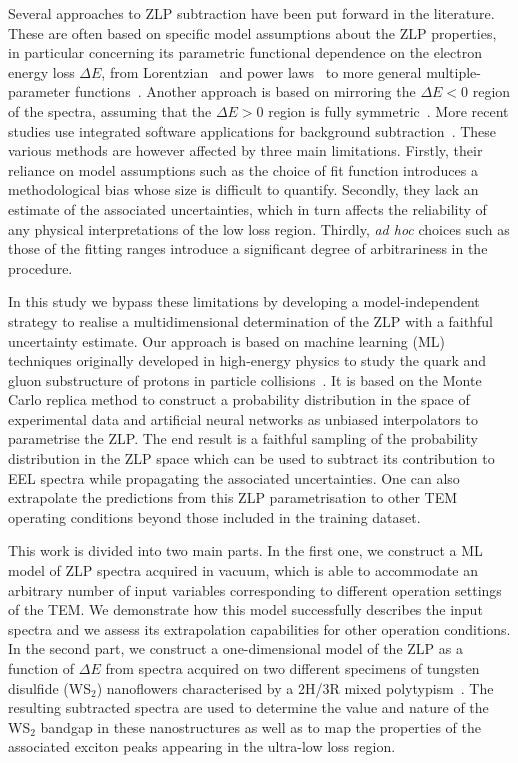 Several approaches to ZLP subtraction\cite{Rafferty:2000, Stoger:2008, Egerton:1996} 
have been put forward in the literature.
%
These are often based on specific model assumptions about the ZLP properties, in particular
concerning its parametric functional dependence on the electron energy loss $\Delta E$,
from Lorentzian~\cite{Dorneich:1998}
and power laws~\cite{Erni:2005} to more general multiple-parameter functions~\cite{Benthem:2001}.
%
Another approach is based on mirroring the $\Delta E <0$ region of the spectra, assuming
that the $\Delta E>0$ region is fully symmetric~\cite{Lazar:2003}.
%
More recent studies use integrated software applications for background
subtraction~\cite{Egerton:10.1016/S0304-3991(01)00155-3, Held:2020, Granerod:2018, Fung:2020}.
%
These various methods are however affected by three main limitations.
%
Firstly, their reliance on model assumptions such as
the choice of fit function introduces a methodological
bias whose size is difficult to quantify.
%
Secondly, they lack an estimate of the associated uncertainties, which in turn affects
the reliability of any physical interpretations of the low loss region.
%
Thirdly, {\it ad hoc} choices such as those of the fitting ranges introduce a significant degree of
arbitrariness in the procedure.



In this study we bypass these limitations by developing a model-independent strategy
to realise a multidimensional determination of the ZLP
with a faithful uncertainty estimate.
%
Our approach is based on machine learning (ML) techniques
originally developed in high-energy physics to study the
quark and gluon substructure of protons in particle collisions~\cite{Ball:2008by,Ball:2012cx,Ball:2014uwa,Ball:2017nwa}.
%
It is based on the Monte Carlo replica method to construct a probability
distribution in the space of experimental data and artificial
neural networks as unbiased interpolators to parametrise the ZLP.
%
The end result is
a faithful sampling of the probability distribution in the ZLP space 
which can be used to subtract its contribution to EEL spectra while
propagating the associated uncertainties.
%
One can also extrapolate the predictions from this ZLP parametrisation to other TEM
operating conditions beyond those included in the training dataset.



This work is divided into two main parts.
%
In the first one, we construct a ML model of ZLP spectra acquired
in vacuum, which is able to accommodate an arbitrary number of input
variables corresponding to different operation settings of the TEM.
%
We demonstrate how this model successfully describes the
input spectra and we assess its extrapolation capabilities for other operation
conditions.
%
In the second part, we construct a one-dimensional model
of the ZLP as a function of $\Delta E$ from spectra acquired on two different specimens of
tungsten disulfide (WS$_2$) nanoflowers characterised by a 2H/3R mixed polytypism~\cite{SabryaWS2}.
%
The resulting subtracted spectra are used to determine
the value and nature of the WS$_2$ bandgap in these nanostructures
as well as to map the properties of the associated exciton peaks appearing in the ultra-low
loss region.



